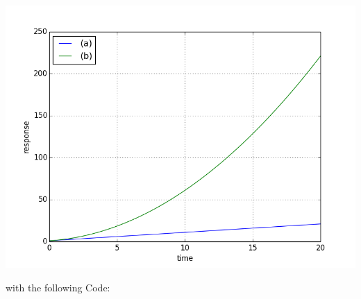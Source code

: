 \documentclass[a4paper,11pt]{article}
\begin{document}
\begin {enumerate}
\begin{enumerate}
				\includegraphics[width=\textwidth]{5-4}
				
				with the following Code:
				
				
				
		\end{enumerate}
		
		
\end {enumerate}
\end{document}
